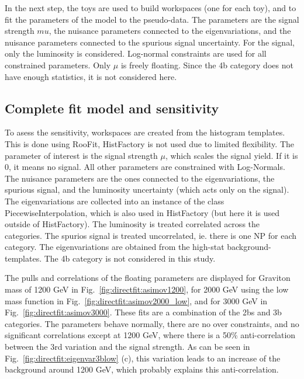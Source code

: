 In the next step, the toys are used to build workspaces (one for each toy), and to fit the parameters of the model to the pseudo-data. The parameters are the signal strength $mu$, the nuisance parameters connected to the eigenvariations, and the nuisance parameters connected to the spurious signal uncertainty. For the signal, only the luminosity is considered. Log-normal constraints are used for all constrained parameters. Only $\mu$ is freely floating. Since the 4b category does not have enough statistics, it is not considered here. 


\subsection{Complete fit model and sensitivity}

To asess the sensitivity, workspaces are created from the histogram templates. This is done using RooFit, HistFactory is not used due to limited flexibility. The parameter of interest is the signal strength $\mu$, which scales the signal yield. If it is 0, it means no signal. All other parameters are constrained with Log-Normals. The nuisance parameters are the ones connected to the eigenvariations, the spurious signal, and the luminosity uncertainty (which acts only on the signal). The eigenvariations are collected into an instance of the class PiecewiseInterpolation, which is also used in HistFactory (but here it is used outside of HistFactory). The luminosity is treated correlated across the categories. The spurios signal is treated uncorrelated, ie. there is one NP for each category. The eigenvariations are obtained from the high-stat background-templates. The 4b category is not considered in this study.

The pulls and correlations of the floating parameters are displayed for Graviton mass of 1200 GeV in Fig.~\ref{fig:directfit:asimov1200}, for 2000 GeV using the low mass function in Fig.~\ref{fig:directfit:asimov2000_low}, and for 3000 GeV in Fig.~\ref{fig:directfit:asimov3000}. These fits are a combination of the 2bs and 3b categories. The parameters behave normally, there are no over constraints, and no significant correlations except at 1200 GeV, where there is a 50\% anti-correlation between the 3rd variation and the signal strength. As can be seen in Fig.~\ref{fig:directfit:eigenvar3blow} (c), this variation leads to an increase of the background around 1200 GeV, which probably explains this anti-correlation.

